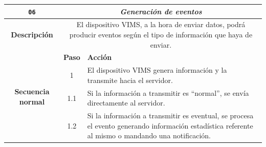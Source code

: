 \begin{table}[H]
  \centering
  \begin{tabularx}{\textwidth}{|c|c|X|}
    \hline
    \texttt{06}                                 & \multicolumn{2}{c|}{\textit{Generación de eventos}}                                                                                                                                                                                                                                                                         \\
    \hline
    \textbf{Descripción}                        & \multicolumn{2}{X|}{El dispositivo \ac{VIMS}, a la hora de enviar datos, podrá producir eventos según el tipo de información que haya de enviar.}                                                                                                                                                                           \\
    \hline
    \multirow{10}{*}{\textbf{Secuencia normal}} & \textbf{Paso}                                                                                                                                     & \textbf{Acción}                                                                                                                                                         \\
    \cline{2-3}
                                                & 1                                                                                                                                                 & \multicolumn{1}{L|}{El dispositivo \ac{VIMS} genera información y la transmite hacia el servidor.}                                                                      \\
    \cline{2-3}
                                                & 1.1                                                                                                                                               & \multicolumn{1}{L|}{Si la información a transmitir es ``normal'', se envía directamente al servidor.}                                                                   \\
    \cline{2-3}
                                                & 1.2                                                                                                                                               & \multicolumn{1}{L|}{Si la información a transmitir es eventual, se procesa el evento generando información estadística referente al mismo o mandando una notificación.} \\

\end{tabularx}
\end{table}
